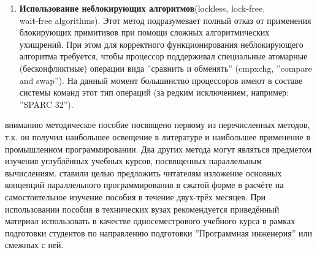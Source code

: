 {\begin{enumerate}
		\item\textbf{Использование неблокирующих алгоритмов}\quad(lockless, lock-free,\\wait-free algorithms). Этот метод подразумевает полный отказ от применения блокирующих примитивов при помощи сложных алгоритмических ухищрений. При этом для корректного функционирования неблокирующего алгоритма требуется, чтобы процессор поддерживал специальные атомарные (бесконфликтные) операции вида ''сравнить и обменять'' (cmpxchg, ''compare and swap''). На данный момент большинство процессоров имеют в составе системы команд этот тип операций (за редким исключением, например: ''SPARC 32'').
	\end{enumerate}
	 вниманию методическое пособие посвящено первому из перечисленных методов, т.к. он получил наибольшее освещение в литературе и наибольшее применение в промышленном программировании. Два других метода могут являться предметом изучения углублённых учебных курсов, посвященных параллельным вычислениям.
	 ставили целью предложить читателям изложение основных концепций параллельного программирования в сжатой форме в расчёте на самостоятельное изучение пособия в течение двух-трёх месяцев. При использовании пособия в технических вузах рекомендуется приведённый материал использовать в качестве односеместрового учебного курса в рамках %
 подготовки студентов по направлению подготовки ''Программная инженерия'' или смежных с ней.%

}